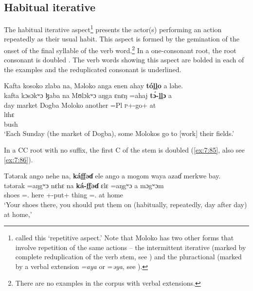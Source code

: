 \subsection{Habitual iterative}\label{sec:7.4.4}
\hypertarget{RefHeading1212281525720847}{}
The habitual iterative aspect\footnote{\citet{FriesenMamalis2008} called this ‘repetitive aspect.’ Note that Moloko has two other forms that involve repetition of the same actions -- the intermittent iterative (marked by complete reduplication of the verb stem, see ) and the pluractional (marked by a verbal extension\textit{ =aya }or =\textit{əya}, see ).} presents the actor(s) performing an action repeatedly as their usual habit. This aspect is formed by the gemination of the onset of the final syllable of the verb word.\footnote{There are no examples in the corpus with verbal extensions.} In a one-consonant root, the root consonant is doubled . The verb words showing this aspect are bolded in each of the examples and the reduplicated consonant is underlined. 

\ea\label{ex:7:84}
Kafta  kosoko  zlaba  na,  Məloko  anga  enen  ahay  \textbf{tó\underline{ll}o}  a  ləhe.\\
\gll  kafta kɔsɔkʷɔ  ɮaba  na  Mʊlɔkʷɔ  aŋga  ɛnɛŋ  =ahaj  \textbf{t\'ɔ-\underline{ll}ɔ}    a \\ 
      day    market  Dogba  {\PSP}  Moloko  {\POSS}  another  =Pl  \textsc{p}+{\IFV}-go+{\ITR}  at \\ 
      
      \medskip
\gll lɪhɛ\\
     bush\\
\glt  ‘Each Sunday (the market of Dogba), some Molokos go to [work] their fields.’\\
\z 

In a CC root with no suffix, the first C of the stem is doubled (\ref{ex:7:85}, also see \ref{ex:7:86}).

\ea\label{ex:7:85}
Tətərak  ango  nehe  na,  \textbf{ká\underline{ff}əɗ}  ele  ango  a  mogom waya  azaɗ  merkwe  bay.\\
\gll  tətərak =aŋgʷɔ nɛhɛ na \textbf{ká-\underline{ff}əɗ} ɛlɛ   =aŋgʷɔ a mɔgʷɔm \\ 
      shoes   ={\twoS}.{\POSS} here   {\PSP}  {\twoS}+{\IFV}-put+{\ITR}  thing   ={\twoS}.{\POSS}     at   home\\  
\glt ‘Your shoes there, you should put them on (habitually, repeatedly, day after day) at home,’\\      
      
